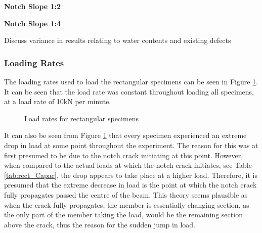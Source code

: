 \documentclass[11pt,a4paper]{article}
\numberwithin{equation}{subsection}
\begin{document}
\noindent
\textbf{Notch Slope 1:2}\par
\noindent


\vspace*{\baselineskip}

\noindent
\textbf{Notch Slope 1:4}\par
\noindent

\vspace*{\baselineskip}
\noindent Discuss variance in results relating to water contents and existing defects \par

\subsubsection{Loading Rates}
The loading rates used to load the rectangular specimens can be seen in Figure \ref{fig:Rect_load}. It can be seen that the load rate was constant throughout loading all specimens, at a load rate of 10kN per minute. 

\begin{figure}[h]
	\begin{center}
	\end{center}
	\caption{Load rates for rectangular specimens}
	\label{fig:Rect_load}
\end{figure}

\noindent
It can also be seen from Figure \ref{fig:Rect_load} that every specimen experienced an extreme drop in load at some point throughout the experiment. The reason for this was at first presumed to be due to the notch crack initiating at this point. However, when compared to the actual loads at which the notch crack initiates, see Table \ref{tab:rect_Capac}, the drop appears to take place at a higher load. Therefore, it is presumed that the extreme decrease in load is the point at which the notch crack fully propagates passed the centre of the beam. This theory seems plausible as when the crack fully propagates, the member is essentially changing section, as the only part of the member taking the load, would be the remaining section above the crack, thus the reason for the sudden jump in load.  
\end{document}
